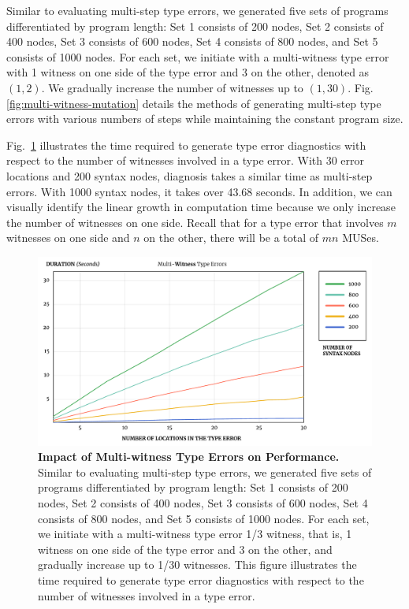 \documentclass[pdflatex,lineno,sn-nature,Numbered]{sn-jnl}%
\begin{document}
Similar to evaluating multi-step type errors, we generated five sets of programs differentiated by program length: Set 1 consists of 200 nodes, Set 2 consists of 400 nodes, Set 3 consists of 600 nodes, Set 4 consists of 800 nodes, and Set 5 consists of 1000 nodes. For each set, we initiate with a multi-witness type error with 1 witness on one side of the type error and 3 on the other, denoted as $(1, 2)$. We gradually increase the number of witnesses up to $(1, 30)$. Fig. \ref{fig:multi-witness-mutation} details the methods of generating multi-step type errors with various numbers of steps while maintaining the constant program size.

Fig.~\ref{fig:multi-witness-time} illustrates the time required to generate type error diagnostics with respect to the number of witnesses involved in a type error. With 30 error locations and 200 syntax nodes, diagnosis takes a similar time as multi-step errors. With 1000 syntax nodes, it takes over 43.68 seconds. In addition, we can visually identify the linear growth in computation time because we only increase the number of witnesses on one side. Recall that for a type error that involves $m$ witnesses on one side and $n$ on the other, there will be a total of $mn$ MUSes.

\begin{figure}[ht]
    \centering
    \includegraphics[width=\linewidth]{images/MultiWitnessDuration}
    \caption{{\bf Impact of Multi-witness Type Errors on Performance.} Similar to evaluating multi-step type errors, we generated five sets of programs differentiated by program length: Set 1 consists of 200 nodes, Set 2 consists of 400 nodes, Set 3 consists of 600 nodes, Set 4 consists of 800 nodes, and Set 5 consists of 1000 nodes. For each set, we initiate with a multi-witness type error 1/3 witness, that is, 1 witness on one side of the type error and 3 on the other, and gradually increase up to 1/30 witnesses. This figure illustrates the time required to generate type error diagnostics with respect to the number of witnesses involved in a type error.}
    \label{fig:multi-witness-time}
\end{figure}
\end{document}

